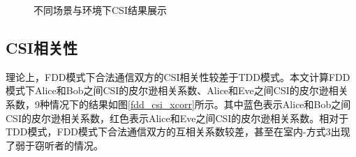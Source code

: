 \documentclass[master]{seuthesis} %
\begin{document}
\begin{Main}
\begin{figure}
{    }
    \caption{不同场景与环境下CSI结果展示}{} %
    \label{fdd_csi_ab}
\end{figure}

\subsection{CSI相关性}

理论上，FDD模式下合法通信双方的CSI相关性较差于TDD模式。本文计算FDD模式下Alice和Bob之间CSI的皮尔逊相关系数、Alice和Eve之间CSI的皮尔逊相关系数，9种情况下的结果如图\ref{fdd_csi_xcorr}所示。其中蓝色表示Alice和Bob之间CSI的皮尔逊相关系数，红色表示Alice和Eve之间CSI的皮尔逊相关系数。相对于TDD模式，FDD模式下合法通信双方的互相关系数较差，甚至在室内-方式3出现了弱于窃听者的情况。


\end{Main}
\end{document}
